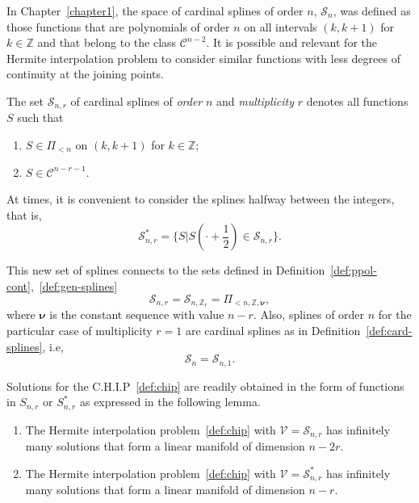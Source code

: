 In Chapter~\ref{chapter1}, the space of cardinal splines of order $n$, $\mathscr{S}_n$, was defined as those functions 
that are polynomials of order $n$ on all intervals $(k, k+1)$ for $k \in \mathbb{Z}$ and that belong to the class 
$\mathcal{C}^{n-2}$. It is possible and relevant for the Hermite interpolation problem to consider similar functions 
with less degrees of continuity at the joining points.
\begin{deftn}
  The set $\mathscr{S}_{n, r}$ of cardinal splines of \emph{order} $n$ and \emph{multiplicity} $r$ denotes all functions 
  $S$ such that
  \begin{enumerate}
    \item $S \in \Pi_{<n}$ on $(k, k+1)$ for $k \in \mathbb{Z}$;
    \item $S \in \mathcal{C}^{n-r-1}$.
  \end{enumerate}
  At times, it is convenient to consider the splines halfway between the integers, that is,
  \begin{equation*}
    \mathscr{S}^*_{n,r} = \{S | S(\cdot + \frac{1}{2}) \in \mathscr{S}_{n,r}\}.
  \end{equation*}
\end{deftn}

\begin{remark}
  This new set of splines connects to the sets defined in Definition~\ref{def:ppol-cont},~\ref{def:gen-splines}
  \begin{equation*}
    \mathscr{S}_{n,r} = \mathscr{S}_{n, \mathbb{Z}_r} = \Pi_{<n, \mathbb{Z}, \bm{\nu}},
  \end{equation*}
  where $\bm{\nu}$ is the constant sequence with value $n-r$. Also, splines of order $n$ for the particular case of 
  multiplicity $r=1$ are cardinal splines as in Definition~\ref{def:card-splines}, i.e,
  \begin{equation*}
    \mathscr{S}_n = \mathscr{S}_{n,1}.
  \end{equation*}
\end{remark}
\noindent Solutions for the C.H.I.P~\ref{def:chip} are readily obtained in the form of functions in $S_{n,r}$ or $S_{n, 
r}^*$ as expressed in the following lemma.
\begin{lem}\label{lemma:manifold}
  \begin{enumerate}
    \item The Hermite interpolation problem~\ref{def:chip} with $\mathcal{V}=\mathscr{S}_{n,r}$ has infinitely many 
      solutions that form a linear manifold of dimension $n-2r$.
    \item The Hermite interpolation problem~\ref{def:chip} with $\mathcal{V}=\mathscr{S}_{n,r}^*$ has infinitely many 
      solutions that form a linear manifold of dimension $n-r$.
  \end{enumerate}
\end{lem}

